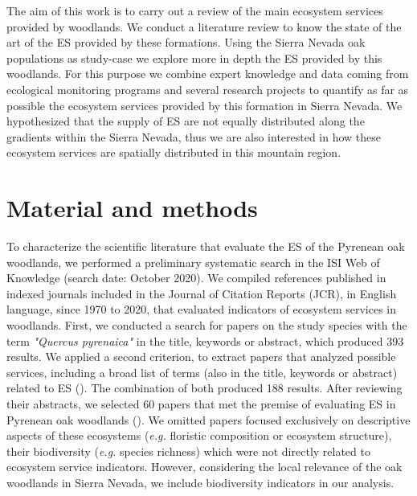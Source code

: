The aim of this work is to carry out a review of the main ecosystem services provided by \Qp woodlands. We conduct a literature review to know the state of the art of the ES provided by these formations. Using the Sierra Nevada oak populations as study-case we explore more in depth the ES provided by this woodlands. For this purpose we combine expert knowledge and data coming from ecological monitoring programs and several research projects to quantify as far as possible the ecosystem services provided by this formation in Sierra Nevada. We hypothesized that the supply of ES are not equally distributed along the gradients within the Sierra Nevada, thus  we are also interested in how these ecosystem services are spatially distributed in this mountain region.

\section{Material and methods}\label{sec:es:mat}

To characterize the scientific literature that evaluate the ES of the Pyrenean oak woodlands, we performed a preliminary systematic search in the ISI Web of Knowledge (search date: October 2020). We compiled references published in indexed journals included in the Journal of Citation Reports (JCR), in English language, since 1970 to 2020, that evaluated indicators of ecosystem services in \Qp woodlands. First, we conducted a search for papers on the study species with the term \emph{"Quercus pyrenaica"} in the title, keywords or abstract, which produced 393 results. We applied a second criterion, to extract papers that analyzed possible services, including a broad list of terms (also in the title, keywords or abstract) related to ES (). The combination of both produced 188 results. After reviewing their abstracts, we selected 60 papers that met the premise of evaluating ES in Pyrenean oak woodlands (). We omitted papers focused exclusively on descriptive aspects of these ecosystems (\emph{e.g.} floristic composition or ecosystem structure), their biodiversity (\emph{e.g.} species richness) which were not directly related to ecosystem service indicators. However, considering the local relevance of the \Qp oak woodlands in Sierra Nevada, we include biodiversity indicators in our analysis. 

